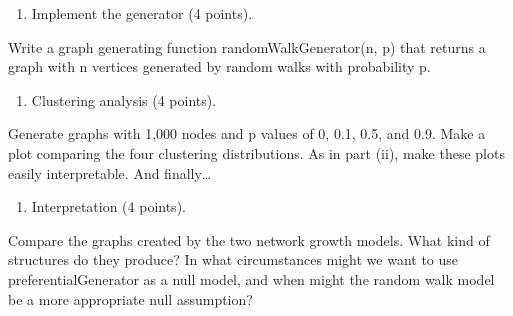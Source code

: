 \documentclass[11pt]{article}
\providecommand{\tightlist}{%
      \setlength{\itemsep}{0pt}\setlength{\parskip}{0pt}}
\begin{document}
\begin{problemstmt}
\begin{enumerate}
\def\labelenumi{(\roman{enumi})}
\setcounter{enumi}{2}
\tightlist
\item
  Implement the generator (4 points).
\end{enumerate}

Write a graph generating function randomWalkGenerator(n, p) that returns
a graph with n vertices generated by random walks with probability p.

\begin{enumerate}
\def\labelenumi{(\roman{enumi})}
\setcounter{enumi}{3}
\tightlist
\item
  Clustering analysis (4 points).
\end{enumerate}

Generate graphs with 1,000 nodes and p values of 0, 0.1, 0.5, and 0.9.
Make a plot comparing the four clustering distributions. As in part
(ii), make these plots easily interpretable. And finally\ldots{}

\begin{enumerate}
\def\labelenumi{(\alph{enumi})}
\setcounter{enumi}{21}
\tightlist
\item
  Interpretation (4 points).
\end{enumerate}

Compare the graphs created by the two network growth models. What kind
of structures do they produce? In what circumstances might we want to
use preferentialGenerator as a null model, and when might the random
walk model be a more appropriate null assumption?
\end{problemstmt}
\end{document}
